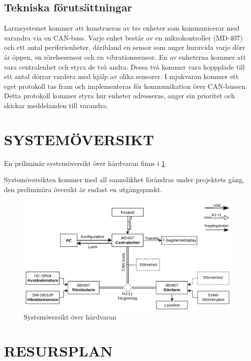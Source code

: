 \documentclass[a4paper]{article}
\begin{document}
\subsection{Tekniska förutsättningar}
\label{sec:tekniskaf}
Larmsystemet kommer att konstrueras av tre enheter som kommunicerar med varandra via en CAN-buss. Varje enhet består av en mikrokontroller (MD-407) och ett antal periferienheter, däribland en sensor som anger huruvida varje dörr är öppen, en rörelsesensor och en vibrationssensor. En av enheterna kommer att vara centralenhet och styra de två andra. Dessa två kommer vara koppplade till ett antal dörrar vardera med hjälp av olika sensorer.
I mjukvaran kommer ett eget protokoll tas fram och implementeras för kommunikation över CAN-bussen. Detta protokoll kommer styra hur enheter adresseras, anger sin prioritet och skickar meddelanden till varandra.



\section{SYSTEMÖVERSIKT}
\label{sec:systemö}
En priliminär systemöversikt över hårdvaran finns i \ref{fig:hardware}.

Systemöversikten kommer med all sannolikhet förändras under projektets gång, den preliminära översikt är endast en utgångspunkt.
\begin{figure}[b]
	\includegraphics[width=1\textwidth]{figurer/Systemoversikt.jpg}
	\caption{Systemöversikt över hårdvaran}
	\label{fig:hardware}
\end{figure}

\section{RESURSPLAN}
\label{sec:resurs}
\end{document}
